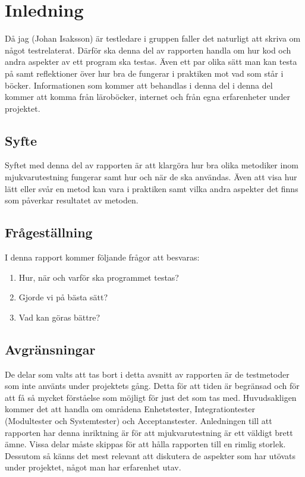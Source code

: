 \section{Inledning}
	Då jag (Johan Isaksson) är testledare i gruppen faller det naturligt att skriva om något testrelaterat. Därför ska denna del av rapporten handla om hur kod och andra aspekter av ett program ska testas. Även ett par olika sätt man kan testa på samt reflektioner över hur bra de fungerar i praktiken mot vad som står i böcker. Informationen som kommer att behandlas i denna del i denna del kommer att komma från läroböcker, internet och från egna erfarenheter under projektet. 
	
	
	\subsection{Syfte}
	Syftet med denna del av rapporten är att klargöra hur bra olika metodiker inom mjukvarutestning fungerar samt hur och när de ska användas. Även att visa hur lätt eller svår en metod kan vara i praktiken samt vilka andra aspekter det finns som påverkar resultatet av metoden.
	
	
	\subsection{Frågeställning}
	I denna rapport kommer följande frågor att besvaras:
	\begin{enumerate}
	\item{Hur, när och varför ska programmet testas?}
	\item{Gjorde vi på bästa sätt?}
	\item{Vad kan göras bättre?}
	\end{enumerate}
	
	\subsection{Avgränsningar}
	De delar som valts att tas bort i detta avsnitt av rapporten är de testmetoder som inte använts under projektets gång. Detta för att tiden är begränsad och för att få så mycket förståelse som möjligt för just det som tas med. Huvudsakligen kommer det att handla om områdena Enhetstester, Integrationtester (Modultester och Systemtester) och Acceptanstester. \newline
	Anledningen till att rapporten har denna inriktning är för att mjukvarutestning är ett väldigt brett ämne. Vissa delar måste skippas för att hålla rapporten till en rimlig storlek. Dessutom så känns det mest relevant att diskutera de aspekter som har utövats under projektet, något man har erfarenhet utav.